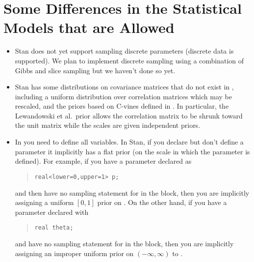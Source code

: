 \section{Some Differences in the Statistical Models that are Allowed}

\begin{itemize}
\item Stan does not yet support sampling discrete parameters (discrete
  data is supported).  We plan to implement discrete sampling using a
  combination of Gibbs and slice sampling but we haven't done so yet.
\item Stan has some distributions on covariance matrices that do not
  exist in \BUGS, including a uniform distribution over correlation
  matrices which may be rescaled, and the priors based on C-vines
  defined in \citep{LewandowskiKurowickaJoe:2009}.  In particular, the
  Lewandowski et al.\ prior allows the correlation matrix to be shrunk
  toward the unit matrix while the scales are given independent priors.
\item In \BUGS you need to define all variables.  In Stan, if you
  declare but don't define a parameter it implicitly has a flat prior
  (on the scale in which the parameter is defined).  For example, if
  you have a parameter  declared as 
\begin{quote}
\begin{Verbatim}[fontsize=\small]
real<lower=0,upper=1> p;
\end{Verbatim}
\end{quote}
%
and then have no sampling statement for  in the 
block, then you are implicitly assigning a uniform $[0,1]$ prior on
.
On the other hand, if you have a parameter  declared with
%
\begin{quote}
\begin{Verbatim}[fontsize=\small]
real theta;
\end{Verbatim}
\end{quote}
%
and have no sampling statement for  in the
 block, 
 then you are implicitly assigning an improper uniform prior
on $(-\infty,\infty)$ to .  
%

\end{itemize}
